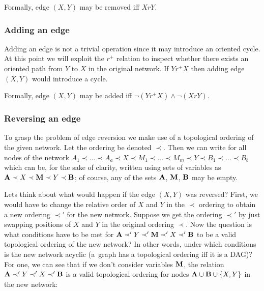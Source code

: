 \documentclass[english,cover]{fitthesis} %
\newcommand{\vars}[1]{{\bold{#1}}}         %
\begin{document}
Formally, edge $(X,Y)$ may be removed iff $XrY$.


\subsubsection{Adding an edge}
Adding an edge is not a trivial operation since it may introduce an oriented cycle. At this point we will exploit the $r^+$ relation to inspect whether there exists an oriented path from $Y$ to $X$ in the original network. If $Y r^+ X$ then adding edge $(X,Y)$ would introduce a cycle.

Formally, edge $(X,Y)$ may be added iff $\neg(Y r^+ X) \land \neg(X r Y)$.


\subsubsection{Reversing an edge}
To grasp the problem of edge reversion we make use of a topological ordering of the given network. Let the ordering be denoted $\prec$. Then we can write for all nodes of the network $A_1 \prec \dots \prec A_a \prec X \prec M_1 \prec \dots \prec M_m \prec Y \prec B_1 \prec \dots \prec B_b$ which can be, for the sake of clarity, written using sets of variables as $\vars{A} \prec X \prec \vars{M} \prec Y \prec \vars{B}$; of course, any of the sets $\vars{A}$, $\vars{M}$, $\vars{B}$ may be empty.

Lets think about what would happen if the edge $(X,Y)$ was reversed? First, we would have to change the relative order of $X$ and $Y$ in the $\prec$ ordering to obtain a new ordering $\prec'$ for the new network. Suppose we get the ordering $\prec'$ by just swapping positions of $X$ and $Y$ in the original ordering $\prec$. Now the question is what conditions have to be met for $\vars{A} \prec' Y \prec' \vars{M} \prec' X \prec' \vars{B}$ to be a valid topological ordering of the new network? In other words, under which conditions is the new network acyclic (a~graph has a topological ordering iff it is a DAG)?
For one, we can see that if we don't consider variables $\vars{M}$, the relation $\vars{A} \prec' Y \prec' X \prec' \vars{B}$ is a valid topological ordering for nodes $\vars{A} \cup \vars{B} \cup \lbrace X,Y \rbrace$ in the new network:
\end{document}
